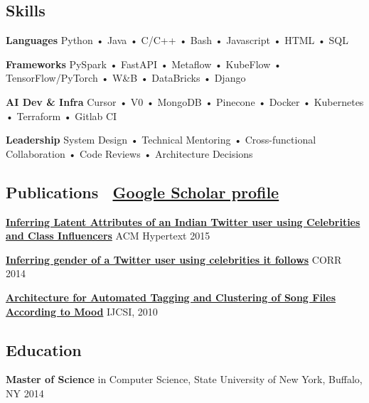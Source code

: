 \documentclass[11pt,letterpaper]{article}
\newcommand{\normalsizesection}{\normalsize}
\newcommand{\smallersection}{\small}
\newcommand{\tinyfootnote}{\fontsize{8pt}{9pt}\selectfont} %
\newcommand{\sectionbox}[1]{%
    \vspace{0.2em}
    \begin{tcolorbox}[
        colback=sectionbg,
        colframe=sectionbg,
        width=\textwidth,
        left=5pt,
        right=5pt,
        top=2pt,
        bottom=2pt,
        boxrule=0pt,
        arc=0pt,
        boxsep=0pt,
    ]
    \section*{#1}
    \end{tcolorbox}
    \vspace{-0.3em}
}
\newcommand{\iconlink}[3]{%
    #1~\href{#2}{#3}%
}
\begin{document}
\normalsizesection

\vspace{30pt} %

\sectionbox{Skills}
\smallersection

\noindent\textbf{Languages} \hspace{2mm} Python • Java • C/C++ • Bash • Javascript • HTML • SQL

\vspace{1pt}
\noindent\textbf{Frameworks} \hspace{0.5mm} PySpark • FastAPI • Metaflow • KubeFlow • TensorFlow/PyTorch • W\&B • DataBricks  • Django

\vspace{1pt}
\noindent\textbf{AI Dev \& Infra} \hspace{1mm} Cursor • V0 • MongoDB • Pinecone • Docker • Kubernetes • Terraform • Gitlab CI

\vspace{1pt}
\noindent\textbf{Leadership} \hspace{4mm} System Design • Technical Mentoring • Cross-functional Collaboration • Code Reviews • Architecture Decisions

\normalsizesection

\sectionbox{Publications \hfill \normalsize\iconlink{\faGraduationCap}{https://scholar.google.com/citations?user=NrYKcaMAAAAJ\&hl=en}{Google Scholar profile}}
\tinyfootnote %

\noindent\textbf{\href{http://dl.acm.org/citation.cfm?id=2806657}{Inferring Latent Attributes of an Indian Twitter user using Celebrities and Class Influencers}} \hfill \href{https://www.youtube.com/watch?v=9BtWs3Rn2Ng}{\faYoutube} ACM Hypertext 2015

\vspace{-1pt}
\noindent\textbf{\href{http://arxiv.org/abs/1405.6667}{Inferring gender of a Twitter user using celebrities it follows}} \hfill CORR 2014

\vspace{-1pt}
\noindent\textbf{\href{http://arxiv.org/abs/1206.2484}{Architecture for Automated Tagging and Clustering of Song Files According to Mood}} \hfill IJCSI, 2010

\normalsizesection

\sectionbox{Education}
\smallersection

\noindent\textbf{Master of Science} in Computer Science, State University of New York, Buffalo, NY \hfill 2014
\end{document}

